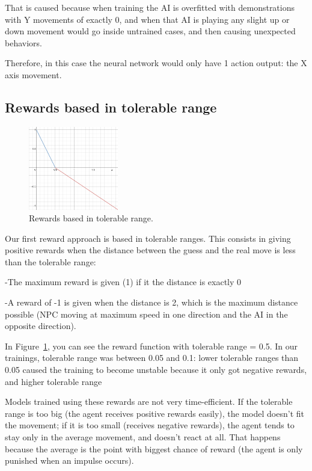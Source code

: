 That is caused because when training the AI is overfitted with demonstrations with Y movements of exactly 0, and when that AI is playing any slight up or down movement would go inside untrained cases, and then causing unexpected behaviors.

Therefore, in this case the neural network would only have 1 action output: the X axis movement.

\pagebreak

\subsection{Rewards based in tolerable range}
\label{sec:tolrange}

\begin{figure}
    \centering
    \includegraphics[width=0.35\textwidth]{img/rewTR.png}
		\caption{Rewards based in tolerable range.}
		\label{fig:trange}
\end{figure}

Our first reward approach is based in tolerable ranges. This consists in giving positive rewards when the distance between the guess and the real move is less than the tolerable range:

-The maximum reward is given (1) if it the distance is exactly 0

-A reward of -1 is given when the distance is 2, which is the maximum distance possible (NPC moving at maximum speed in one direction and the AI in the opposite direction).

In Figure~\ref{fig:trange}, you can see the reward function with tolerable range = 0.5. In our trainings, tolerable range was between 0.05 and 0.1: lower tolerable ranges than 0.05 caused the training to become unstable because it only got negative rewards, and higher tolerable range

Models trained using these rewards are not very time-efficient. If the tolerable range is too big (the agent receives positive rewards easily), the model doesn't fit the movement; if it is too small (receives negative rewards), the agent tends to stay only in the average movement, and doesn't react at all. That happens because the average is the point with biggest chance of reward (the agent is only punished when an impulse occurs). 

